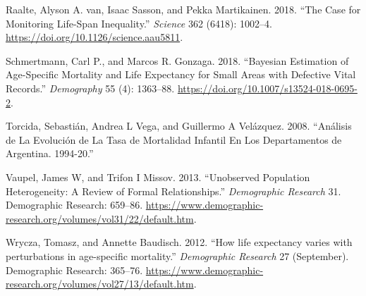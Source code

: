 \documentclass[12pt,]{article}
\begin{document}
\leavevmode\hypertarget{ref-vanRaalte_Sasson_Martikainen_2018}{}%
Raalte, Alyson A. van, Isaac Sasson, and Pekka Martikainen. 2018. ``The
Case for Monitoring Life-Span Inequality.'' \emph{Science} 362 (6418):
1002--4. \url{https://doi.org/10.1126/science.aau5811}.

\leavevmode\hypertarget{ref-Schmertmann2018}{}%
Schmertmann, Carl P., and Marcos R. Gonzaga. 2018. ``Bayesian Estimation
of Age-Specific Mortality and Life Expectancy for Small Areas with
Defective Vital Records.'' \emph{Demography} 55 (4): 1363--88.
\url{https://doi.org/10.1007/s13524-018-0695-2}.

\leavevmode\hypertarget{ref-torcida2008}{}%
Torcida, Sebastián, Andrea L Vega, and Guillermo A Velázquez. 2008.
``Análisis de La Evolución de La Tasa de Mortalidad Infantil En Los
Departamentos de Argentina. 1994-20.''

\leavevmode\hypertarget{ref-Vaupel_Missov_2013}{}%
Vaupel, James W, and Trifon I Missov. 2013. ``Unobserved Population
Heterogeneity: A Review of Formal Relationships.'' \emph{Demographic
Research} 31. Demographic Research: 659--86.
\url{https://www.demographic-research.org/volumes/vol31/22/default.htm}.

\leavevmode\hypertarget{ref-Wrycza2012}{}%
Wrycza, Tomasz, and Annette Baudisch. 2012. ``How life expectancy varies
with perturbations in age-specific mortality.'' \emph{Demographic
Research} 27 (September). Demographic Research: 365--76.
\url{https://www.demographic-research.org/volumes/vol27/13/default.htm}.
\end{document}
